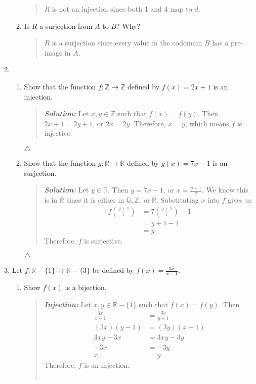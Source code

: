 \documentclass{article}
\newcommand{\SLN}{\indent\textit{\textbf{Solution: }}}
\newcommand{\ZZ}{\mathbb{Z}}
\newcommand{\RR}{\mathbb{R}}
\newcommand{\QQ}{\mathbb{Q}}
\begin{document}
\begin{enumerate}
\begin{enumerate}
\begin{quote}
$R$ is not an injection since both 1 and 4 map to $d$.
\end{quote}
\item Is $R$ a surjection from $A$ to $B$? Why?
\begin{quote}
$R$ is a surjection since every value in the codomain $B$ has a pre-image in $A$.
\end{quote}
\end{enumerate}
\newpage
\item
\begin{enumerate}
\item Show that the function $f:\ZZ \to \ZZ$ defined by $f(x)=2x+1$ is an injection.
\begin{quote}
\SLN Let $x,y \in \ZZ$ such that $f(x) = f(y)$.
Then $2x + 1 = 2y + 1$, or $2x = 2y$.
Therefore, $x = y$, which means $f$ is injective.
\end{quote}
$\triangle$
\item Show that the function $g:\RR \to \RR$ defined by $g(x) = 7x - 1$ is an surjection.
\begin{quote}
\SLN Let $y \in \RR$. Then $y = 7x - 1$, or $x = \frac{y + 1}{7}$.
We know this is in $\RR$ since it is either in $\QQ, \ZZ,\ \text{or}\  \RR$.
Substituting $x$ into $f$ gives us
\begin{align*}
f\left(\frac{y + 1}{7}\right) &= 7\left(\frac{y + 1}{7}\right) - 1\\
&= y + 1 - 1\\
&= y
\end{align*}
Therefore, $f$ is surjective.
\end{quote}
$\triangle$
\end{enumerate}
\item Let $f: \RR - \{1\} \to \RR - \{3\}$ be defined by $f(x) = \frac{3x}{x - 1}$.
\begin{enumerate}
\item Show $f(x)$ is a bijection.
\begin{quote}
\textit{\textbf{Injection: }} Let $x,y \in \RR - \{1\}$ such that $f(x) = f(y)$.
Then
\begin{align*}
\frac{3x}{x - 1} &= \frac{3y}{y - 1}\\
(3x)(y - 1) &= (3y)(x - 1)\\
3xy - 3x &= 3xy - 3y\\
-3x &= -3y\\
x &= y.
\end{align*}
Therefore, $f$ is an injection.\\\\

\end{quote}
\end{enumerate}
\end{enumerate}
\end{document}
